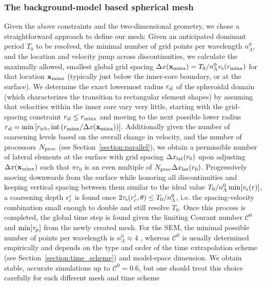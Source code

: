 \documentclass[11pt,letter,fleqn,english,notitlepage]{article}
\newcommand{\bx}{\mbox{${\bf x}$}} \newcommand{\bw}{\mbox{${\bf w}$}}
\begin{document}
\subsubsection{The background-model based spherical mesh}
%
Given the above constraints and the two-dimensional geometry, 
we chose a straightforward approach to define our mesh: 
Given an anticipated dominant period $T_0$ 
to be resolved, the minimal number of grid points per wavelength $n^0_\Lambda$, 
and the location and velocity jump across discontinuities,
we calculate the maximally allowed, smallest global grid spacing  
$\Delta x(\bx_{\rm minx})=T_0/n^0_\Lambda v_{\rm s}(r_{\rm minx})$  for that location 
$\bx_{\rm minx}$ (typically just below the inner-core boundary, or at the surface). 
We determine the exact lowermost radius $r_{\rm sl}$ of the spheroidal domain 
(which characterizes the transition to rectangular element shapes)
by assuming that velocities within the inner core vary very little, starting with 
the grid-spacing constraint $r_{\rm sl}\le r_{\rm minx}$ and moving to 
the next possible lower radius
$r_{\rm sl}=\min\left[r_{\rm icb},{\rm int}\left(r_{\rm minx}/\Delta x(\bx_{\rm minx})\right)\right]$.
Additionally given the number of coarsening levels based 
on the overall change in velocity, and the number of processors $N_{\rm proc}$
(see Section~\ref{section:parallel}), we obtain a permissible number of lateral 
elements at the surface with grid spacing $\Delta x_{\rm lat}(r_0)$ 
upon adjusting $\Delta x(\bx_{\rm minx})$ such that 
$\pi r_0$ is an even multiple of $N_{\rm proc} \Delta x_{\rm lat}(r_0)$.
Progressively moving downwards from the surface while honoring all 
discontinuities and keeping vertical spacing between them similar to 
the ideal value $T_0/n^0_\Lambda \min[v_{\rm s}(r)]$, a coarsening depth 
$\textstyle{r_{\rm c}^i}$ is 
found once $\textstyle{2\tau_{\rm s}(r_{\rm c}^i,\theta)\le T_0/n^0_\Lambda}$, 
i.e. the spacing-velocity combination small enough to double and still resolve $T_0$. 
Once this process is completed, the global time step is found given the limiting 
Courant number ${\mathcal C}^0$ and $\min[\tau_{\rm p}]$ from the newly 
created mesh.
For the SEM, the minimal possible number of points per wavelength is 
$n_\Lambda^0\approx4$ \citep[e.g.][]{Ampuero+:07}, whereas ${\mathcal C}^0$ is 
usually determined empirically and depends on the type and 
order of the time extrapolation scheme (see Section~\ref{section:time_scheme})
and model-space dimension.
We obtain stable, accurate simulations up to ${\mathcal C}^0=0.6$, but one should 
treat this choice carefully for each different mesh and time scheme 
\end{document}
